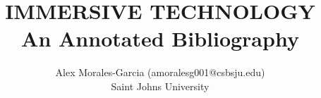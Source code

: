\documentclass [11pt]{article}
\title{IMMERSIVE TECHNOLOGY \\\medskip An Annotated Bibliography}
\author{Alex Morales-Garcia (amoralesg001@csbsju.edu)\\Saint Johns University}
\begin{document}
\maketitle
\nocite{*}


\end{document}

